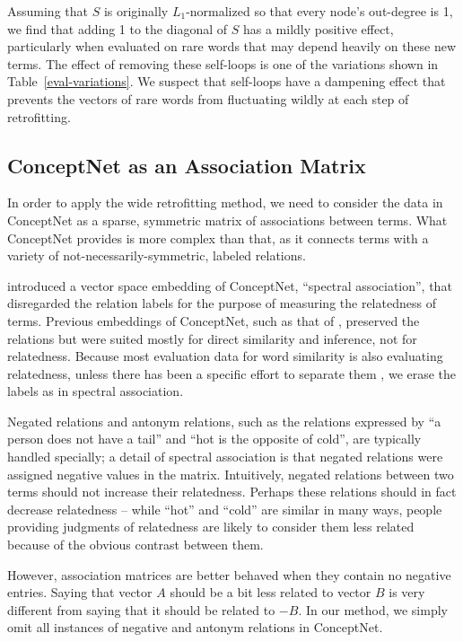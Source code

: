 \documentclass[11pt]{article}
\begin{document}
Assuming that $S$ is originally $L_1$-normalized so that every node's
out-degree is 1, we find that adding 1 to the diagonal of $S$ has a mildly
positive effect, particularly when evaluated on rare words that may depend
heavily on these new terms. The effect of removing these self-loops is one of
the variations shown in Table~\ref{eval-variations}.  We suspect that
self-loops have a dampening effect that prevents the vectors of rare words from
fluctuating wildly at each step of retrofitting.

\subsection{ConceptNet as an Association Matrix}

In order to apply the wide retrofitting method, we need to consider the data in
ConceptNet as a sparse, symmetric matrix of associations between terms. What
ConceptNet provides is more complex than that, as it connects terms with a
variety of not-necessarily-symmetric, labeled relations.

 introduced a vector space embedding of ConceptNet,
``spectral association'', that disregarded the relation labels for the purpose
of measuring the relatedness of terms. Previous embeddings of ConceptNet, such
as that of , preserved the relations but were
suited mostly for direct similarity and inference, not for relatedness. Because
most evaluation data for word similarity is also evaluating relatedness, unless
there has been a specific effort to separate them \cite{agirre2009similarity},
we erase the labels as in spectral association.

Negated relations and antonym relations, such as the relations expressed by
``a person does not have a tail'' and ``hot is the opposite of cold'', are
typically handled specially; a detail of spectral association is that negated
relations were assigned negative values in the matrix. Intuitively, negated
relations between two terms should not increase their relatedness. Perhaps
these relations should in fact decrease relatedness -- while ``hot'' and
``cold'' are similar in many ways, people providing judgments of relatedness
are likely to consider them less related because of the obvious contrast
between them.

However, association matrices are better behaved when they contain no negative
entries. Saying that vector $A$ should be a bit less related to vector
$B$ is very different from saying that it should be related to $-B$.
In our method, we simply omit all instances of negative and antonym
relations in ConceptNet.
\end{document}
